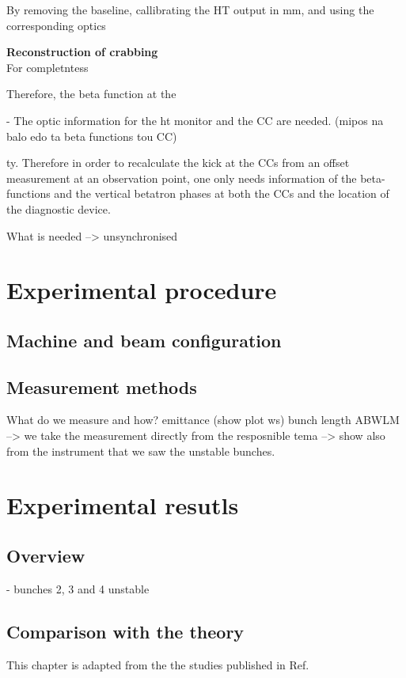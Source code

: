 By removing the baseline, callibrating the HT output in mm, and using the corresponding optics 

\normalsize{\textbf{Reconstruction of crabbing}}\\
For completntess


Therefore, the beta function at the 


- The optic information for the ht monitor and the CC are needed.  (mipos na balo edo ta beta functions tou CC)

ty. Therefore in order
to recalculate the kick at the CCs from an offset measurement at an observation point, one only needs information of
the beta-functions and the vertical betatron phases at both
the CCs and the location of the diagnostic device.


\newpage



What is needed --> unsynchronised


\section{Experimental procedure}

\subsection{Machine and beam configuration}
\subsection{Measurement methods}
 What do we measure and how? emittance (show plot ws)
 bunch length ABWLM --> we take the measurement directly from the resposnible tema
 --> show also from the instrument that we saw the unstable bunches.

 \section{Experimental resutls}
 \subsection{Overview}
 - bunches 2, 3 and 4 unstable
 \subsection{Comparison with the theory}

 \newpage 
 This chapter is adapted from the the studies published in Ref.~\cite{Triantafyllou}


